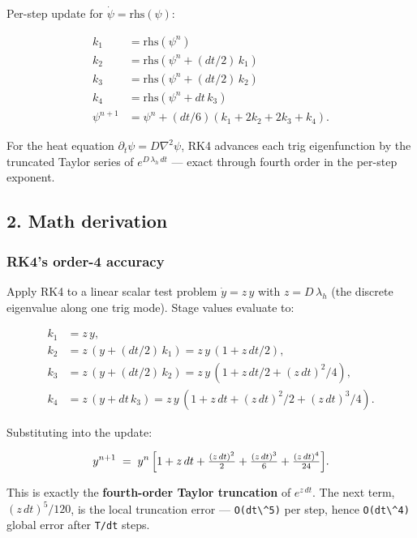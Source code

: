 Per-step update for \(\dot\psi = \mathrm{rhs}(\psi)\):

\[
\begin{aligned}
k_1 &= \mathrm{rhs}(\psi^n) \\
k_2 &= \mathrm{rhs}(\psi^n + (dt/2)\,k_1) \\
k_3 &= \mathrm{rhs}(\psi^n + (dt/2)\,k_2) \\
k_4 &= \mathrm{rhs}(\psi^n + dt\,k_3) \\
\psi^{n+1} &= \psi^n + (dt/6)(k_1 + 2 k_2 + 2 k_3 + k_4).
\end{aligned}
\]

For the heat equation \(\partial_t\psi = D\nabla^2\psi\), RK4 advances
each trig eigenfunction by the truncated Taylor series of
\(e^{D\,\lambda_h\,dt}\) --- exact through fourth order in the per-step
exponent.

\subsection{2. Math derivation}\label{math-derivation}

\subsubsection{RK4's order-4 accuracy}\label{rk4s-order-4-accuracy}

Apply RK4 to a linear scalar test problem \(\dot y = z\,y\) with
\(z = D\,\lambda_h\) (the discrete eigenvalue along one trig mode).
Stage values evaluate to:

\[
\begin{aligned}
k_1 &= z\,y, \\
k_2 &= z\,(y + (dt/2)\,k_1) = z\,y\,(1 + z\,dt/2), \\
k_3 &= z\,(y + (dt/2)\,k_2) = z\,y\,(1 + z\,dt/2 + (z\,dt)^2/4), \\
k_4 &= z\,(y + dt\,k_3) = z\,y\,(1 + z\,dt + (z\,dt)^2/2 + (z\,dt)^3/4).
\end{aligned}
\]

Substituting into the update:

\[
y^{n+1} \;=\; y^n\,\Bigl[1 + z\,dt + \tfrac{(z\,dt)^2}{2} + \tfrac{(z\,dt)^3}{6} + \tfrac{(z\,dt)^4}{24}\Bigr].
\]

This is exactly the \textbf{fourth-order Taylor truncation} of
\(e^{z\,dt}\). The next term, \((z\,dt)^5/120\), is the local truncation
error --- \passthrough{\lstinline!O(dt\^5)!} per step, hence
\passthrough{\lstinline!O(dt\^4)!} global error after
\passthrough{\lstinline!T/dt!} steps.

